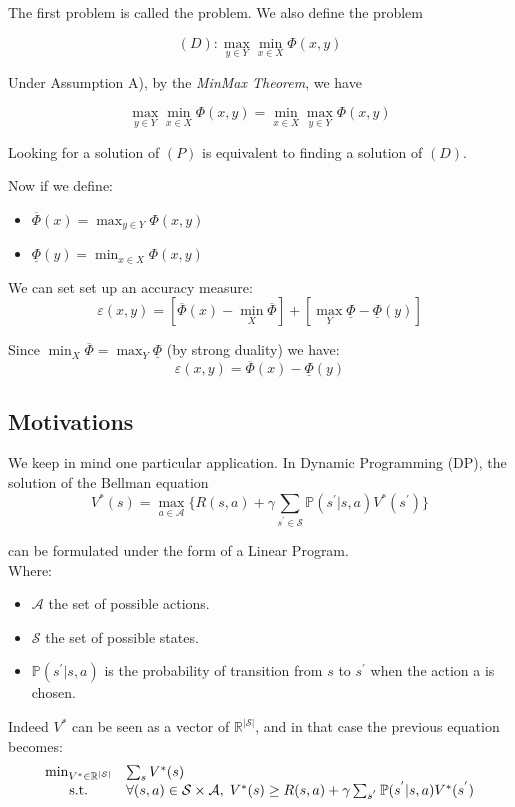 \documentclass[12pt,reqno]{amsart}
\numberwithin{equation}{section}
\begin{document}
The first problem is called the  problem. We also define the  problem

$$
(D): \max_{y \in Y}\min_{x \in X} \Phi(x,y)
$$

Under Assumption A), by the \emph{MinMax Theorem}, we have 

$$
\max_{y \in Y}\min_{x \in X} \Phi(x,y) = \min_{x \in X}\max_{y \in Y} \Phi(x,y)
$$

Looking for a solution of $(P)$ is equivalent to finding a solution of $(D)$.

Now if we define:
\begin{itemize}
\item $\overline{\Phi}(x) = \max_{y \in Y}\Phi(x,y)$
\item $\underline{\Phi}(y) = \min_{x \in X}\Phi(x,y)$
\end{itemize}



We can set set up  an accuracy measure:
$$
\boxed{ \varepsilon(x,y) = [\overline{\Phi}(x) - \min_{X}\overline{\Phi}] + [\max_{Y}\underline{\Phi} - \underline{\Phi}(y)] }
$$

Since $\min_{X}\overline{\Phi} = \max_{Y}\underline{\Phi}$ (by  strong duality) we have:
$$
\boxed{\varepsilon(x,y) = \overline{\Phi}(x) - \underline{\Phi}(y)}
$$


\subsection{Motivations}

We keep in mind one particular application.
In Dynamic Programming (DP), the solution of the Bellman equation
$$
V^{*}(s) = \max_{a \in \mathcal{A}} \{ R(s,a) + \gamma \sum_{s^{'} \in \mathcal{S}} \mathbb{P}(s^{'} | s,a)V^{*}(s^{'}) \}
$$

can be formulated under the form of a Linear Program.\\

Where:
\begin{itemize}
\item $\mathcal{A}$ the set of possible actions.
\item $\mathcal{S}$ the set of possible states.
\item $\mathbb{P}(s^{'} | s,a)$ is the probability of transition from $s$ to $s^{'}$ when the action a is chosen.
\end{itemize}



Indeed $V^{*}$ can be seen as a vector of $\mathbb{R}^{|\mathcal{S}|}$, and in that case the previous equation becomes:
\begin{equation}\label{MLSDP}
\begin{array}{cl}
\min_{V^{*} \in \mathbb{R}^{|\mathcal{S}|}} & \sum_{s} V^{*}(s)  \\
\text{s.t.} & \forall (s, a)\in \mathcal{S} \times \mathcal{A}, \hspace{0.1cm} V^{*}(s) \geq R(s,a) + \gamma \sum_{s^{'}}\mathbb{P}(s^{'}| s,a )V^{*}(s^{'})\\
\end{array}
\end{equation}
\end{document}
